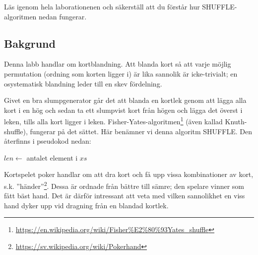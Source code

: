 

\Lab{\LabWeekFIVE}

\begin{Goals}

\end{Goals}

\begin{Preparations}
\item {}
\item Läs igenom hela laborationenen och säkerställ att du förstår hur SHUFFLE-algoritmen nedan fungerar.
\end{Preparations}

\subsection{Bakgrund}

Denna labb handlar om kortblandning. Att blanda kort så att varje möjlig permutation (ordning som korten ligger i) är lika sannolik är icke-trivialt; en osystematisk blandning leder till en skev fördelning.

Givet en bra slumpgenerator går det att blanda en kortlek genom att lägga alla kort i en hög och sedan ta ett slumpvist kort från högen och lägga det överst i leken, tills alla kort ligger i leken. Fisher-Yates-algoritmen\footnote{\href{https://en.wikipedia.org/wiki/Fisher\%E2\%80\%93Yates_shuffle}{https://en.wikipedia.org/wiki/Fisher\%E2\%80\%93Yates\_shuffle}} (även kallad Knuth-shuffle), fungerar på det sättet. Här benämner vi denna algoritm SHUFFLE. Den återfinns i pseudokod nedan:

\begin{algorithm}[H]
 $len \leftarrow$ antalet element i $xs$ \\
\end{algorithm}

Kortspelet poker handlar om att dra kort och få upp vissa kombinationer av kort, s.k. ''händer''\footnote{\href{https://sv.wikipedia.org/wiki/Pokerhand}{https://sv.wikipedia.org/wiki/Pokerhand}}. Dessa är ordnade från bättre till sämre; den spelare vinner som fått bäst hand.
Det är därför intressant att veta med vilken sannolikhet en viss hand dyker upp vid dragning från en blandad kortlek.

